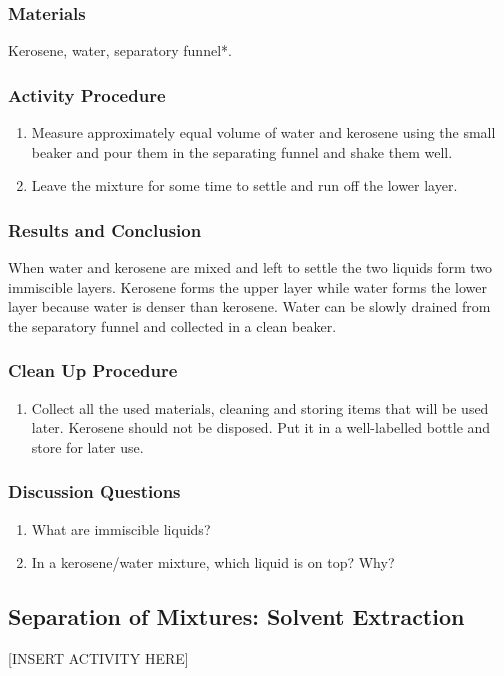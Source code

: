 \subsubsection*{Materials}
Kerosene, water, separatory funnel*.

\subsubsection*{Activity Procedure}
\begin{enumerate}
\item{Measure approximately equal volume of water and kerosene using the small beaker and pour them in the separating funnel and shake them well.}
\item{Leave the mixture for some time to settle and run off the lower layer.}
\end{enumerate}

\subsubsection*{Results and Conclusion}
When water and kerosene are mixed and left to settle the two liquids form two immiscible layers. Kerosene forms the upper layer while water forms the lower layer because water is denser than kerosene. Water can be slowly drained from the separatory funnel and collected in a clean beaker.

\subsubsection*{Clean Up Procedure}
\begin{enumerate}
\item{Collect all the used materials, cleaning and storing items that will be used later. Kerosene should not be disposed. Put it in a well-labelled bottle and store for later use.}
\end{enumerate}

\subsubsection*{Discussion Questions}
\begin{enumerate}
\item{What are immiscible liquids?}
\item{In a kerosene/water mixture, which liquid is on top? Why?}
\end{enumerate}

\subsection{Separation of Mixtures: Solvent Extraction}

[INSERT ACTIVITY HERE]
